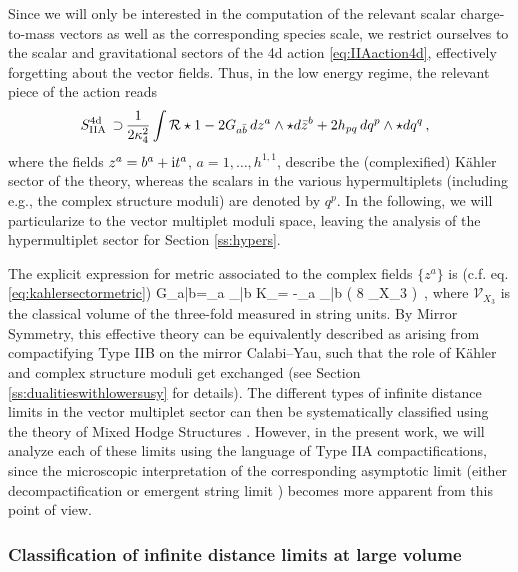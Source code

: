 Since we will only be interested in the computation of the relevant scalar charge-to-mass vectors as well as the corresponding species scale, we restrict ourselves to the scalar and gravitational sectors of the 4d action \eqref{eq:IIAaction4d}, effectively forgetting about the vector fields. Thus, in the low energy regime, the relevant piece of the action reads
%
\begin{equation}\label{eq:IIAscalaraction4d}
	\begin{aligned}
		\ S^{\text{4d}}_{\rm IIA}\, \supset\, & \frac{1}{2\kappa^2_4} \int \mathcal{R} \star 1 -2 G_{a\bar b}\, d z^a\wedge \star d\bar z^b + 2h_{pq}\, d q^p \wedge \star d q^q\, ,
	\end{aligned}
\end{equation}
%
where the fields $z^a=b^a+{\rm i}t^a$, $a=1,\ldots, h^{1,1}$, describe the (complexified) K\"ahler sector of the theory, whereas the scalars in the various hypermultiplets (including e.g., the complex structure moduli) are denoted by $q^p$. In the following, we will particularize to the vector multiplet moduli space, leaving the analysis of the hypermultiplet sector for Section \ref{ss:hypers}. 

The explicit expression for metric associated to the complex fields $\{ z^a \}$ is (c.f. eq. \eqref{eq:kahlersectormetric})
%
\beq\label{eq:kahlersectormetricpattern}
	G_{a\bar b}=\partial_a \partial_{\bar{b}} K_{}= -\partial_a \partial_{\bar{b}} \log \left( 8 _{X_3} \right)\, ,
\eeq
%
where $\mathcal{V}_{X_3}$ is the classical volume of the three-fold measured in string units. By Mirror Symmetry, this effective theory can be equivalently described as arising from compactifying Type IIB on the mirror Calabi--Yau, such that the role of K\"ahler and complex structure moduli get exchanged (see Section \ref{ss:dualitieswithlowersusy} for details). The different types of infinite distance limits in the vector multiplet sector can then be systematically classified using the theory of Mixed Hodge Structures \cite{Grimm:2018ohb, Grimm:2018cpv}. However, in the present work, we will analyze each of these limits using the language of Type IIA compactifications, since the microscopic interpretation of the corresponding asymptotic limit (either decompactification or emergent string limit \cite{Lee:2019wij}) becomes more apparent from this point of view.
	
\subsubsection*{Classification of infinite distance limits at large volume}
\label{sss:largevolume}
	
